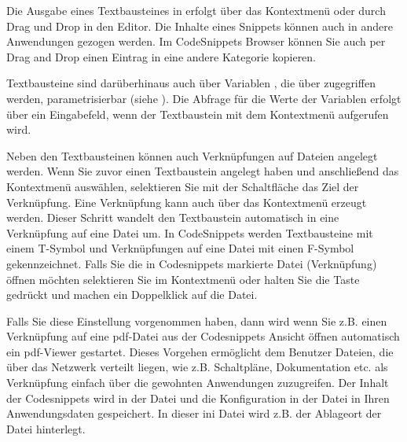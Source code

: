 
Die Ausgabe eines Textbausteines in \codeblocks erfolgt über das Kontextmenü  oder durch Drag und Drop in den Editor. Die Inhalte eines Snippets können auch in andere Anwendungen gezogen werden. Im CodeSnippets Browser können Sie auch per Drag and Drop einen Eintrag in eine andere Kategorie kopieren.

Textbausteine sind darüberhinaus auch über Variablen , die über  zugegriffen werden, parametrisierbar (siehe ). Die Abfrage für die Werte der Variablen erfolgt über ein Eingabefeld, wenn der Textbaustein mit dem Kontextmenü  aufgerufen wird.

Neben den Textbausteinen können auch Verknüpfungen auf Dateien angelegt werden. Wenn Sie zuvor einen Textbaustein angelegt haben und anschließend das Kontextmenü  auswählen, selektieren Sie mit der Schaltfläche  das Ziel der Verknüpfung. Eine Verknüpfung kann auch über das Kontextmenü  erzeugt werden. Dieser Schritt wandelt den Textbaustein automatisch in eine Verknüpfung auf eine Datei um. In CodeSnippets werden Textbausteine mit einem T-Symbol und Verknüpfungen auf eine Datei mit einen F-Symbol gekennzeichnet. Falls Sie die in Codesnippets markierte Datei (Verknüpfung) öffnen möchten selektieren Sie im Kontextmenü  oder halten Sie die  Taste gedrückt und machen ein Doppelklick auf die Datei.


Falls Sie diese Einstellung vorgenommen haben, dann wird wenn Sie z.B. einen Verknüpfung auf eine pdf-Datei aus der Codesnippets Ansicht öffnen automatisch ein pdf-Viewer gestartet. Dieses Vorgehen ermöglicht dem Benutzer Dateien, die über das Netzwerk verteilt liegen, wie z.B. Schaltpläne, Dokumentation etc. als Verknüpfung einfach über die gewohnten Anwendungen zuzugreifen. Der Inhalt der Codesnippets wird in der Datei  und die Konfiguration in der Datei  in Ihren Anwendungsdaten gespeichert. In dieser ini Datei wird z.B. der Ablageort der Datei  hinterlegt.

